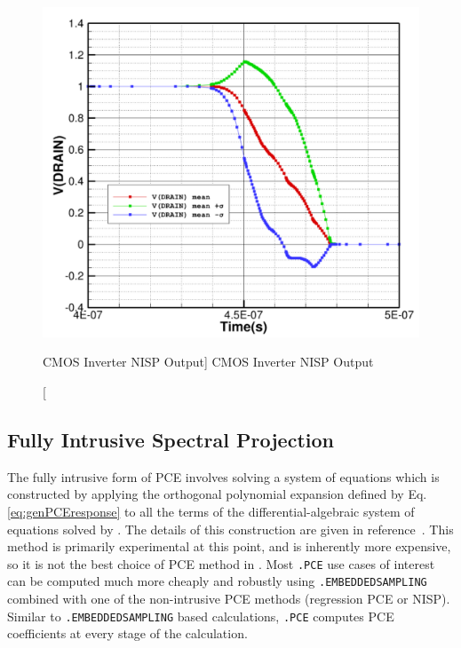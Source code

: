\begin{figure}[hbt]
\centering
\includegraphics[width=5in]{cmos_inverter_result.pdf}
\caption
  [CMOS Inverter NISP Output] {CMOS Inverter NISP Output}
\label{NISP_result1}
\end{figure}

\clearpage
\subsection{Fully Intrusive Spectral Projection}
\label{intrusivePCE}
The fully intrusive form of PCE involves solving a system of equations which is constructed by 
applying the orthogonal polynomial expansion defined by 
Eq. \eqref{eq:genPCEresponse} to all the terms of the differential-algebraic 
system of equations solved by \Xyce{}.  The details of this construction are given in 
reference~\cite{xyceAdvancedUQ}.  This method is primarily experimental at this
point, and is inherently more expensive,
so it is not the best choice of PCE method in \Xyce{}.   Most \texttt{.PCE} use cases of
interest can be computed much more cheaply and robustly using \texttt{.EMBEDDEDSAMPLING} 
combined with one of the non-intrusive PCE methods (regression PCE or NISP).
Similar to \texttt{.EMBEDDEDSAMPLING} based calculations, \texttt{.PCE} computes
PCE coefficients at every stage of the calculation.   

